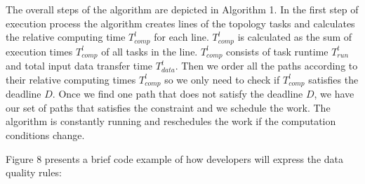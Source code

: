 
The overall steps of the algorithm are depicted in Algorithm 1. In the first step of execution process the algorithm creates lines of the topology tasks and calculates the relative computing time $T_{comp}^l$ for each line. $T_{comp}^l$ is calculated as the sum of execution times $T_{comp}^l$ of all tasks in the line. $T_{comp}^l$ consists of task runtime $T_{run}^t$ and total input data transfer time $T_{data}^t$. Then we order all the paths according to their relative computing times $T_{comp}^l$ so we only need to check if $T_{comp}^l$ satisfies the deadline $D$. Once we find one path that does not satisfy the deadline $D$, we have our set of paths that satisfies the constraint and we schedule the work. The algorithm is constantly running and reschedules the work if the computation conditions change.


Figure 8 presents a brief code example of how developers will express the data quality rules:


